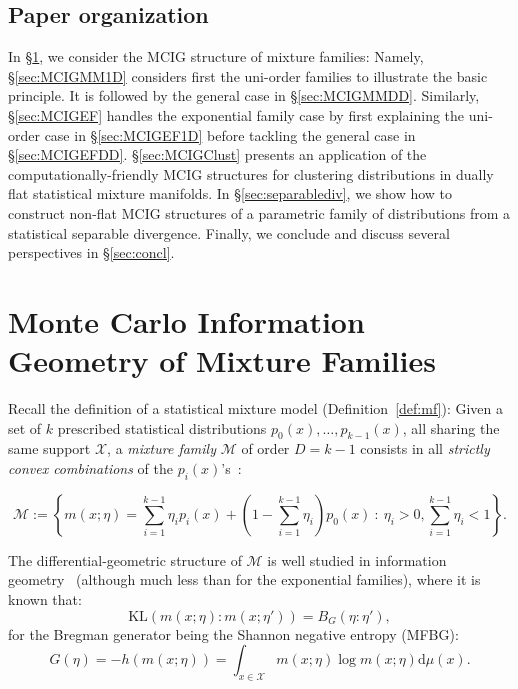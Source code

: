 \documentclass[graybox]{svmult}
\def\dmu{\mathrm{d}\mu}
\def\KL{\mathrm{KL}}
\def\eqdef{:=}
\def\calX{\mathcal{X}}
\def\calM{\mathcal{M}}
\def\st{{\ :\ }}
\begin{document}
 
\subsection{Paper organization}
In \S\ref{sec:MCIGMF}, we consider the MCIG structure of mixture families: 
Namely, \S\ref{sec:MCIGMM1D} considers first the uni-order families  to illustrate the basic principle. 
It is followed by the general case in \S\ref{sec:MCIGMMDD}.
Similarly, \S\ref{sec:MCIGEF} handles the exponential family case by first explaining the uni-order case in \S\ref{sec:MCIGEF1D} before tackling the general case in \S\ref{sec:MCIGEFDD}.
\S\ref{sec:MCIGClust} presents an application of the computationally-friendly MCIG structures for clustering distributions in dually flat statistical  mixture manifolds.
In \S\ref{sec:separablediv}, we show how to construct non-flat MCIG
structures of a parametric family of distributions from a statistical separable divergence.
Finally, we conclude and discuss several perspectives in \S\ref{sec:concl}.



\section{Monte Carlo Information Geometry of Mixture Families}\label{sec:MCIGMF}


Recall the definition  of a statistical mixture model (Definition~\ref{def:mf}):
Given a set of $k$ prescribed statistical distributions $p_0(x),\ldots, p_{k-1}(x)$, all sharing the same support $\calX$, a
 {\em mixture family} $\calM$ of order $D=k-1$ consists in all {\em strictly convex combinations} of the $p_i(x)$'s~\cite{wmixture-2017}:

\begin{equation}
\calM \eqdef  \left\{ m(x;\eta)= \sum_{i=1}^{k-1} \eta_ip_i(x)+ (1-\sum_{i=1}^{k-1} \eta_i)p_0(x) \st \eta_i>0, \sum_{i=1}^{k-1} \eta_i<1 \right\}.
\end{equation}

The differential-geometric structure of $\calM$ is well studied in information geometry~\cite{IG-2014,IG-2016} (although much less than for the exponential families), where it is known that:
\begin{equation}
\KL(m(x;\eta):m(x;\eta')) = B_G(\eta:\eta'),
\end{equation}
for the Bregman generator being the Shannon negative entropy (MFBG):
\begin{equation} 
G(\eta)=-h(m(x;\eta))=\int_{x\in\calX} m(x;\eta)\log m(x;\eta) \dmu(x).
\end{equation}
 
\end{document}
